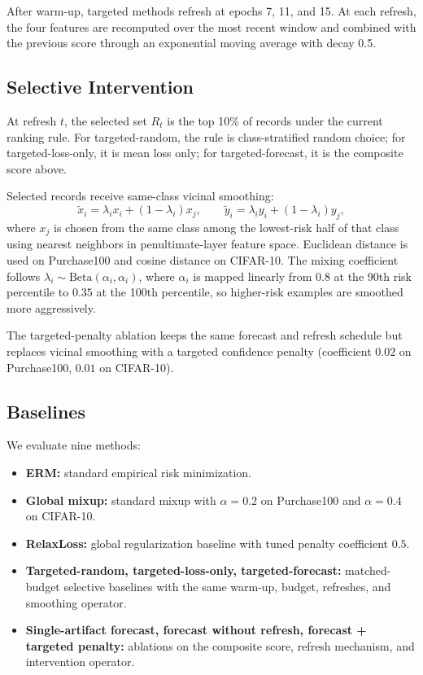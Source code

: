 \documentclass{article}
\newcommand{\purch}{Purchase100}
\newcommand{\cifar}{CIFAR-10}
\begin{document}
After warm-up, targeted methods refresh at epochs 7, 11, and 15. At each refresh, the four features are recomputed over the most recent window and combined with the previous score through an exponential moving average with decay 0.5.

\subsection{Selective Intervention}

At refresh $t$, the selected set $R_t$ is the top 10\% of records under the current ranking rule. For targeted-random, the rule is class-stratified random choice; for targeted-loss-only, it is mean loss only; for targeted-forecast, it is the composite score above.

Selected records receive same-class vicinal smoothing:
\begin{equation}
\tilde{x}_i = \lambda_i x_i + (1-\lambda_i)x_j, \qquad
\tilde{y}_i = \lambda_i y_i + (1-\lambda_i)y_j,
\end{equation}
where $x_j$ is chosen from the same class among the lowest-risk half of that class using nearest neighbors in penultimate-layer feature space. Euclidean distance is used on \purch{} and cosine distance on \cifar{}. The mixing coefficient follows $\lambda_i \sim \mathrm{Beta}(\alpha_i,\alpha_i)$, where $\alpha_i$ is mapped linearly from $0.8$ at the 90th risk percentile to $0.35$ at the 100th percentile, so higher-risk examples are smoothed more aggressively.

The targeted-penalty ablation keeps the same forecast and refresh schedule but replaces vicinal smoothing with a targeted confidence penalty (coefficient $0.02$ on \purch{}, $0.01$ on \cifar{}).

\subsection{Baselines}

We evaluate nine methods:
\begin{itemize}
    \item \textbf{ERM:} standard empirical risk minimization.
    \item \textbf{Global mixup:} standard mixup with $\alpha=0.2$ on \purch{} and $\alpha=0.4$ on \cifar{}.
    \item \textbf{RelaxLoss:} global regularization baseline with tuned penalty coefficient $0.5$.
    \item \textbf{Targeted-random, targeted-loss-only, targeted-forecast:} matched-budget selective baselines with the same warm-up, budget, refreshes, and smoothing operator.
    \item \textbf{Single-artifact forecast, forecast without refresh, forecast + targeted penalty:} ablations on the composite score, refresh mechanism, and intervention operator.
\end{itemize}
\end{document}
